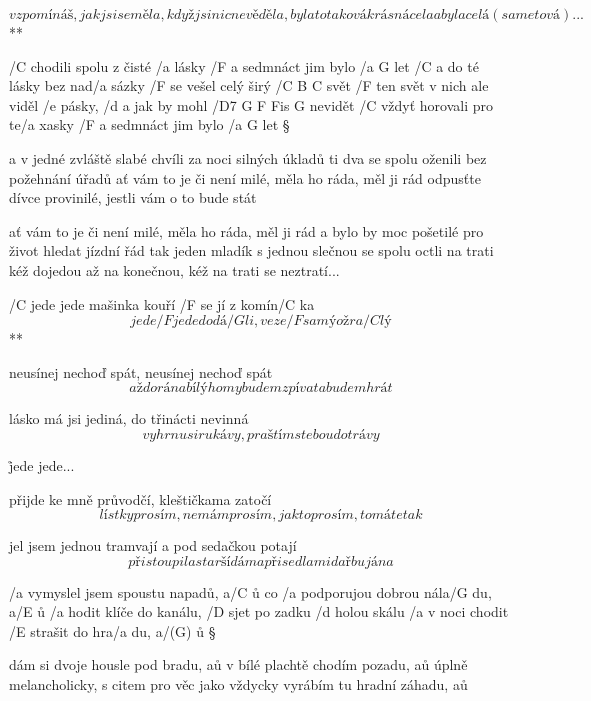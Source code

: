 \R  \[ vzpomínáš, jak jsi se měla, když jsi nic nevěděla,
    byla to taková krásná cela a byla celá (sametová) ... \] **




/C chodili spolu z čisté /a lásky /F a sedmnáct jim bylo /{a G} let
/C a do té lásky bez nad/a sázky /F se vešel celý širý /{C B C} svět
/F ten svět v nich ale viděl /e pásky, /d a jak by mohl /{D7 G F Fis G} nevidět
/C vždyť horovali pro te/a xasky /F a sedmnáct jim bylo /{a G} let \S

a v jedné zvláště slabé chvíli za noci silných úkladů
ti dva se spolu oženili bez požehnání úřadů
ať vám to je či není milé, měla ho ráda, měl ji rád
odpusťte dívce provinilé, jestli vám o to bude stát \s

ať vám to je či není milé, měla ho ráda, měl ji rád
a bylo by moc pošetilé pro život hledat jízdní řád
tak jeden mladík s jednou slečnou se spolu octli na trati
kéž dojedou až na konečnou, kéž na trati se neztratí...




\R  /C jede jede mašinka kouří /F se jí z komín/C ka
    \[ jede /F jede do dá/G li, veze /F samý ožra/C lý \] **

neusínej nechoď spát, neusínej nechoď spát
\[ až do rána bílýho my budem zpívat a budem hrát \] \s

lásko má jsi jediná, do třinácti nevinná
\[ vyhrnu si rukávy, praštím s tebou do trávy \]

\r  jede jede...

přijde ke mně průvodčí, kleštičkama zatočí
\[ lístky prosím, nemám prosím, jak to prosím, to máte tak \]

\rr

jel jsem jednou tramvají a pod sedačkou potají
\[ přistoupila starší dáma přisedla mi dařbujána \]

\rr




/a vymyslel jsem spoustu napadů, a/C ů
co /a podporujou dobrou nála/G du, a/E ů
/a hodit klíče do kanálu, /D sjet po zadku /d holou skálu
/a v noci chodit /E strašit do hra/a du, a/(G) ů \S

dám si dvoje housle pod bradu, aů
v bílé plachtě chodím pozadu, aů
úplně melancholicky, s citem pro věc jako vždycky
vyrábím tu hradní záhadu, aů


